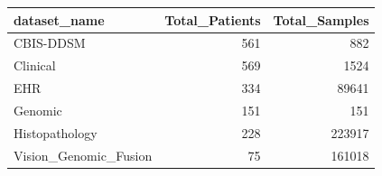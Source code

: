\begin{tabular}{lrr}
\toprule
dataset\_name & Total\_Patients & Total\_Samples \\
\midrule
CBIS-DDSM & 561 & 882 \\
Clinical & 569 & 1524 \\
EHR & 334 & 89641 \\
Genomic & 151 & 151 \\
Histopathology & 228 & 223917 \\
Vision\_Genomic\_Fusion & 75 & 161018 \\
\bottomrule
\end{tabular}
